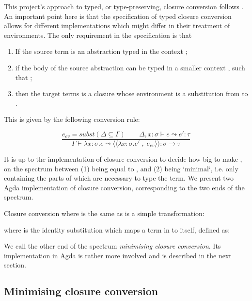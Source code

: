 \documentclass[bsc,frontabs,twoside,singlespacing,parskip,deptreport]{infthesis}
\theoremstyle{definition}
\begin{document}
This project's approach to typed, or type-preserving, closure
conversion follows \cite{DBLP:conf/popl/MinamideMH96}. An important
point here is that the specification of typed closure conversion
allows for different implementations which might differ in their
treatment of environments. The only requirement in the specification
is that

\begin{enumerate}
\item If the source term is an abstraction typed in the context
  ;
\item if the body of the source abstraction can be typed in a smaller
  context , such that ;
\item then the target terms is a closure whose environment is a
  substitution from  to .
\end{enumerate}

This is given by the following conversion rule:

\[
  \frac
  {e_{ev} = subst (\Delta \subseteq \Gamma) \quad \quad \Delta , x : \sigma \vdash e \leadsto e' : \tau }
  {\Gamma \vdash \lambda x : \sigma . e \leadsto
    \langle\langle \lambda x : \sigma . e' \; , \; e_{ev} \rangle\rangle : \sigma \rightarrow \tau}
\]

It is up to the implementation of closure conversion to decide how big
to make , on the spectrum between (1)  being equal to
, and (2)  being `minimal`, i.e. only containing the parts
of  which are necessary to type the term. We present two Agda
implementation of closure conversion, corresponding to the two ends of
the spectrum.

Closure conversion where  is the same as  is a simple
transformation:


where  is the identity substitution which maps a term
in  to itself, defined as:


We call the other end of the spectrum \textit{minimising closure
  conversion}. Its implementation in Agda is rather more involved and
is described in the next section.

\subsection{Minimising closure conversion}
\label{sec:minim-clos-conv}
\end{document}
